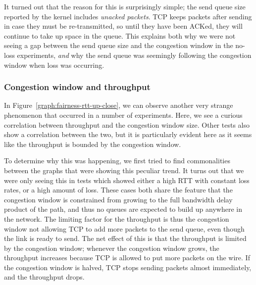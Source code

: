 It turned out that the reason for this is surprisingly simple; the send queue
size reported by the kernel includes \textit{unacked packets}. TCP keeps packets
after sending in case they must be re-transmitted, so until they have been
ACKed, they will continue to take up space in the queue. This explains both why
we were not seeing a gap between the send queue size and the congestion window
in the no-loss experiments, \emph{and} why the send queue was seemingly
following the congestion window when loss was occurring.

\subsubsection{Congestion window and throughput}

In Figure~\ref{graph:fairness-rtt-up-close}, we can observe another very strange
phenomenon that occurred in a number of experiments. Here, we see a curious
correlation between throughput and the congestion window size. Other tests also
show a correlation between the two, but it is particularly evident here as it 
seems like the throughput is bounded by the congestion window.

To determine why this was happening, we first tried to find commonalities
between the graphs that were showing this peculiar trend. It turns out that we
were only seeing this in tests which showed either a high RTT with constant loss
rates, or a high amount of loss. These cases both share the feature that the
congestion window is constrained from growing to the full bandwidth delay
product of the path, and thus no queues are expected to build up anywhere in the
network. The limiting factor for the throughput is thus the congestion window not
allowing TCP to add more packets to the send queue, even though the link is
ready to send. The net effect of this is that the throughput is limited by the
congestion window; whenever the congestion window grows, the throughput
increases because TCP is allowed to put more packets on the wire. If the
congestion window is halved, TCP stops sending packets almost immediately, and
the throughput drops.
